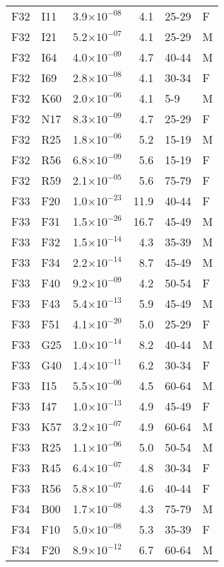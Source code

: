 \begin{longtable}{lllrll}
   F32 & I11 & 3.9$\times10^{-08}$ & 4.1 & 25-29 & F \\ 
   F32 & I21 & 5.2$\times10^{-07}$ & 4.1 & 25-29 & M \\ 
   F32 & I64 & 4.0$\times10^{-09}$ & 4.7 & 40-44 & M \\ 
   F32 & I69 & 2.8$\times10^{-08}$ & 4.1 & 30-34 & F \\ 
   F32 & K60 & 2.0$\times10^{-06}$ & 4.1 & 5-9 & M \\ 
   F32 & N17 & 8.3$\times10^{-09}$ & 4.7 & 25-29 & F \\ 
   F32 & R25 & 1.8$\times10^{-06}$ & 5.2 & 15-19 & M \\ 
   F32 & R56 & 6.8$\times10^{-09}$ & 5.6 & 15-19 & F \\ 
   F32 & R59 & 2.1$\times10^{-05}$ & 5.6 & 75-79 & F \\ 
   F33 & F20 & 1.0$\times10^{-23}$ & 11.9 & 40-44 & F \\ 
   F33 & F31 & 1.5$\times10^{-26}$ & 16.7 & 45-49 & M \\ 
   F33 & F32 & 1.5$\times10^{-14}$ & 4.3 & 35-39 & M \\ 
   F33 & F34 & 2.2$\times10^{-14}$ & 8.7 & 45-49 & M \\ 
   F33 & F40 & 9.2$\times10^{-09}$ & 4.2 & 50-54 & F \\ 
   F33 & F43 & 5.4$\times10^{-13}$ & 5.9 & 45-49 & M \\ 
   F33 & F51 & 4.1$\times10^{-20}$ & 5.0 & 25-29 & F \\ 
   F33 & G25 & 1.0$\times10^{-14}$ & 8.2 & 40-44 & M \\ 
   F33 & G40 & 1.4$\times10^{-11}$ & 6.2 & 30-34 & F \\ 
   F33 & I15 & 5.5$\times10^{-06}$ & 4.5 & 60-64 & M \\ 
   F33 & I47 & 1.0$\times10^{-13}$ & 4.9 & 45-49 & F \\ 
   F33 & K57 & 3.2$\times10^{-07}$ & 4.9 & 60-64 & M \\ 
   F33 & R25 & 1.1$\times10^{-06}$ & 5.0 & 50-54 & M \\ 
   F33 & R45 & 6.4$\times10^{-07}$ & 4.8 & 30-34 & F \\ 
   F33 & R56 & 5.8$\times10^{-07}$ & 4.6 & 40-44 & F \\ 
   F34 & B00 & 1.7$\times10^{-08}$ & 4.3 & 75-79 & M \\ 
   F34 & F10 & 5.0$\times10^{-08}$ & 5.3 & 35-39 & F \\ 
   F34 & F20 & 8.9$\times10^{-12}$ & 6.7 & 60-64 & M \\ 

\end{longtable}
